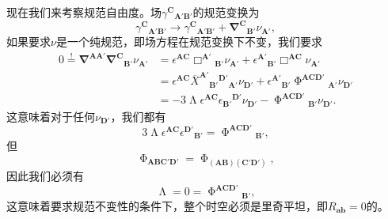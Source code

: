 现在我们来考察规范自由度。场$\gamma ^{\boldsymbol{C}}{}_{\boldsymbol{A} '\boldsymbol{B} '}$的规范变换为
\begin{equation}
	\gamma ^{\boldsymbol{C}}{}_{\boldsymbol{A} '\boldsymbol{B} '}\rightarrow \gamma ^{\boldsymbol{C}}{}_{\boldsymbol{A} '\boldsymbol{B} '} +\mathbf{\nabla }^{\boldsymbol{C}}{}_{\boldsymbol{B} '} \nu _{\boldsymbol{A} '} ,
	\label{eq:7.28}
\end{equation}
如果要求$\nu $是一个纯规范，即场方程在规范变换下不变，我们要求
\begin{equation*}
	\begin{aligned}
		0\stackrel{!}{=}\mathbf{\nabla }^{\boldsymbol{AA} '}\mathbf{\nabla }^{\boldsymbol{C}}{}_{\boldsymbol{B} '} \nu _{\boldsymbol{A} '} & =\epsilon ^{\boldsymbol{AC}} \Box ^{\boldsymbol{A} '}{}_{\boldsymbol{B} '} \nu _{\boldsymbol{A} '} +\epsilon ^{\boldsymbol{A} '}{}_{\boldsymbol{B} '} \Box ^{\boldsymbol{AC}} \nu _{\boldsymbol{A} '}\\
		& =\epsilon ^{\boldsymbol{AC}}\overline{X}^{\boldsymbol{A} '}{}{_{\boldsymbol{B} '}}^{\boldsymbol{D} '}{}_{\boldsymbol{A} '} \nu _{\boldsymbol{D} '} +\epsilon ^{\boldsymbol{A} '}{}_{\boldsymbol{B} '} \upPhi ^{\boldsymbol{ACD} '}{}_{\boldsymbol{A} '} \nu _{\boldsymbol{D} '}\\
		& =-3\upLambda \epsilon ^{\boldsymbol{AC}} \epsilon {_{\boldsymbol{B} '}}^{\boldsymbol{D} '} \nu _{\boldsymbol{D} '} -\upPhi ^{\boldsymbol{ACD} '}{}_{\boldsymbol{B} '} \nu _{\boldsymbol{D} '} .
	\end{aligned}
\end{equation*}
这意味着对于任何$\nu _{\boldsymbol{D} '}$，我们都有
\begin{equation*}
	3\upLambda \epsilon ^{\boldsymbol{AC}} \epsilon ^{\boldsymbol{D} '}{}_{\boldsymbol{B} '} =\upPhi ^{\boldsymbol{ACD} '}{}_{\boldsymbol{B} '} ,
\end{equation*}
但
\begin{equation*}
	\upPhi _{\boldsymbol{ABC} '\boldsymbol{D} '} =\upPhi _{(\boldsymbol{AB})(\boldsymbol{C} '\boldsymbol{D} ')} ,
\end{equation*}
因此我们必须有
\begin{equation*}
	\upLambda =0=\upPhi ^{\boldsymbol{ACD} '}{}_{\boldsymbol{B} '} ,
\end{equation*}
这意味着要求规范不变性的条件下，整个时空必须是里奇平坦，即$R_{\boldsymbol{ab}} =0$的。



